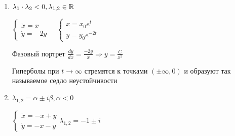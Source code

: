 \documentclass[12pt]{article}
\begin{document}
\begin{enumerate}[label*=\arabic*) ]
        $\lim_{t \to +\infty} x(t) = 0, \lim_{t \to +\infty} y(t) = 0$, то есть $(0, 0)$ -- устойчивое решение

         $\begin{cases}\dot x = -x \\ \dot y = -2y\end{cases} \Longleftrightarrow
        \begin{cases}\frac{dx}{x} = -dt \\ \frac{dy}{y} = -2dt\end{cases} \Longleftrightarrow
        \begin{cases}x = C_1 e^{-t} \\ y = C_2 e^{-2t}\end{cases} \text{ + Н.У.} \Longrightarrow
        \begin{cases}x = x_0 e^{-t} \\ y = y_0 e^{-2t}\end{cases}$

        Изобразим интегральные кривые (фазовый портрет системы): СДУ $\Longrightarrow \frac{dy}{dx} = \frac{2y}{x} \Longrightarrow y = Cx^2$

        В этом примере получается семейство парабол, при $t \to +\infty$ они все стремятся к $(0, 0)$ -- устойчивому узлу

        \item $\lambda_1 \cdot \lambda_2 < 0, \lambda_{1,2} \in \mathbb{R}$

         $\begin{cases}\dot x = x \\ \dot y = -2y\end{cases} \quad \begin{cases}x = x_0 e^t \\ y = y_0 e^{-2t}\end{cases}$

        Фазовый портрет $\frac{dy}{dx} = \frac{-2y}{x} \Longrightarrow y = \frac{C}{x^2}$

        Гиперболы при $t \to \infty$ стремятся к точками $(\pm \infty, 0)$ и образуют так называемое седло неустойчивости

        \item $\lambda_{1,2} = \alpha \pm i \beta, \alpha < 0$

         $\begin{cases}\dot x = -x + y \\ \dot y = -x - y\end{cases} \lambda_{1,2} = -1 \pm i$


\end{enumerate}
\end{document}
